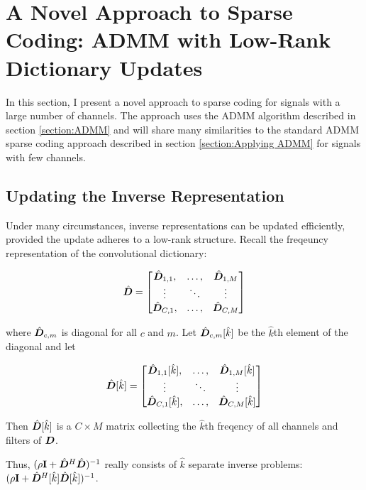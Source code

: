\section{A Novel Approach to Sparse Coding: ADMM with Low-Rank Dictionary Updates}
In this section, I present a novel approach to sparse coding for signals with a large number of channels. The approach uses the ADMM algorithm described in section \ref{section:ADMM} and will share many similarities to the standard ADMM sparse coding approach described in section \ref{section:Applying ADMM} for signals with few channels.

\subsection{Updating the Inverse Representation}

Under many circumstances, inverse representations can be updated efficiently, provided the update adheres to a low-rank structure. Recall the freqeuncy representation of the convolutional dictionary:

\begin{equation}
\hat{\bm{D}} = \begin{bmatrix}
\hat{\bm{D}}_{1,1}, & \hdots, & \hat{\bm{D}}_{1,M}\\
\vdots & \ddots & \vdots\\
\hat{\bm{D}}_{C,1}, & \hdots, & \hat{\bm{D}}_{C,M}
\end{bmatrix}
\end{equation}

where $\hat{\bm{D}}_{c,m}$ is diagonal for all $c$ and $m$. Let $\hat{\bm{D}}_{c,m}[\hat{k}]$ be the $\hat{k}$th element of the diagonal and let

\begin{equation}
\hat{\bm{D}}[\hat{k}] = \begin{bmatrix}
\hat{\bm{D}}_{1,1}[\hat{k}], & \hdots, & \hat{\bm{D}}_{1,M}[\hat{k}]\\
\vdots & \ddots & \vdots\\
\hat{\bm{D}}_{C,1}[\hat{k}], & \hdots, & \hat{\bm{D}}_{C,M}[\hat{k}]
\end{bmatrix}
\end{equation}

Then $\hat{\bm{D}}[\hat{k}]$ is a $C \times M$ matrix collecting the $\hat{k}$th freqency of all channels and filters of $\bm{D}$.

Thus, $(\rho{\bf I} + \hat{\bm{D}}^H\hat{\bm{D}})^{-1}$ really consists of $\hat{k}$ separate inverse problems: $(\rho{\bf I} + \hat{\bm{D}}^H[\hat{k}]\hat{\bm{D}}[\hat{k}])^{-1}$.

